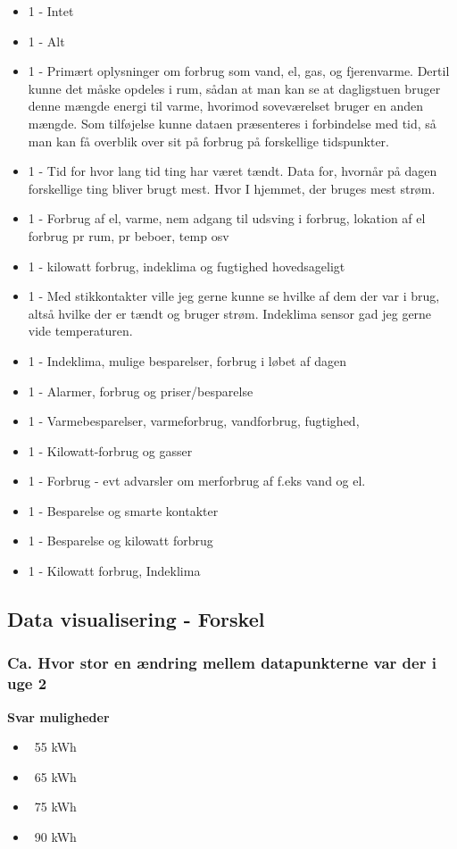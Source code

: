 \begin{itemize}
    \item 1 - Intet
    \item 1 - Alt
    \item 1 - Primært oplysninger om forbrug som vand, el, gas, og fjerenvarme. Dertil kunne det måske opdeles i rum, sådan at man kan se at dagligstuen bruger denne mængde energi til varme, hvorimod soveværelset bruger en anden mængde. Som tilføjelse kunne dataen præsenteres i forbindelse med tid, så man kan få overblik over sit på forbrug på forskellige tidspunkter.
    \item 1 - Tid for hvor lang tid ting har været tændt. Data for, hvornår på dagen forskellige ting bliver brugt mest. Hvor I hjemmet, der bruges mest strøm.
    \item 1 - Forbrug af el, varme, nem adgang til udsving i forbrug, lokation af el forbrug pr rum, pr beboer, temp osv
    \item 1 - kilowatt forbrug, indeklima og fugtighed hovedsageligt
    \item 1 - Med stikkontakter ville jeg gerne kunne se hvilke af dem der var i brug, altså hvilke der er tændt og bruger strøm. Indeklima sensor gad jeg gerne vide temperaturen.
    \item 1 - Indeklima, mulige besparelser, forbrug i løbet af dagen
    \item 1 - Alarmer, forbrug og priser/besparelse
    \item 1 - Varmebesparelser, varmeforbrug, vandforbrug, fugtighed,
    \item 1 - Kilowatt-forbrug og gasser
    \item 1 - Forbrug - evt advarsler om merforbrug af f.eks vand og el.
    \item 1 - Besparelse og smarte kontakter
    \item 1 - Besparelse og kilowatt forbrug
    \item 1 - Kilowatt forbrug, Indeklima
\end{itemize}

\subsection{Data visualisering - Forskel}
\subsubsection{Ca. Hvor stor en ændring mellem datapunkterne var der i uge 2}
\textbf{Svar muligheder}
\begin{itemize}
    \item ~55 kWh
    \item ~65 kWh
    \item ~75 kWh
    \item ~90 kWh
\end{itemize}

